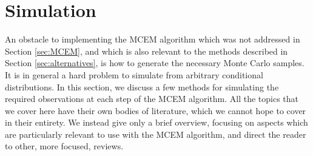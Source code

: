 \documentclass[11pt, oneside]{article}   	%
\newcommand{\bQ}{\mathbb{Q}}
\begin{document}
\begin{comment}
A major advantage of the mean-field approximation is that an iterative algorithm exists for finding the density, $q$, which maximizes the ELBO. This algorithm performs coordinate ascent, and the coordinate updates are closely related to computation of the full conditional distributions in Gibbs sampling \citep{need}. Write $q^{(k)} = \prod q_j^{(k)}$ for the current value of $q$, and $\bQ^{(k)}_{-j}$ for expectation with respect to all the missing variables except $j$, under $q^{(k)}$. The update formula is
%
\begin{align}
    q_j^{(k+1)} &\propto \exp \left[ \bQ^{(k)}_{-j} \ell_c(y, x_j, X_{-j}) \right] \label{eq:var_inf_update}
\end{align}
%
where $X_{-j}$ is all the missing variables other than $X_j$. See Section 2.4 of \citet{Ble17} for a derivation of (\ref{eq:var_inf_update}). The overall algorithm consists of repeatedly cycling through updating each coordinate's distribution until some convergence criterion is met.

Note that, so far, our discussion of how to compute the mean-field approximate density for $X$ has not addressed $\theta$. To apply mean-field variational inference to EM-type problems, we substitute the mean-field density into the ELBO and maximize over $\theta$. This new value of $\theta$ is fed back into ($\ref{eq:var_inf_update}$), giving us a different complete data likelihood function and, hence, a new optimal density.
\end{comment}




\section{Simulation}
\label{sec:simulation}

An obstacle to implementing the MCEM algorithm which was not addressed in Section \ref{sec:MCEM}, and which is also relevant to the methods described in Section \ref{sec:alternatives}, is how to generate the necessary Monte Carlo samples. It is in general a hard problem to simulate from arbitrary conditional distributions. In this section, we discuss a few methods for simulating the required observations at each step of the MCEM algorithm. All the topics that we cover here have their own bodies of literature, which we cannot hope to cover in their entirety. We instead give only a brief overview, focusing on aspects which are particularly relevant to use with the MCEM algorithm, and direct the reader to other, more focused, reviews.
\end{document}
